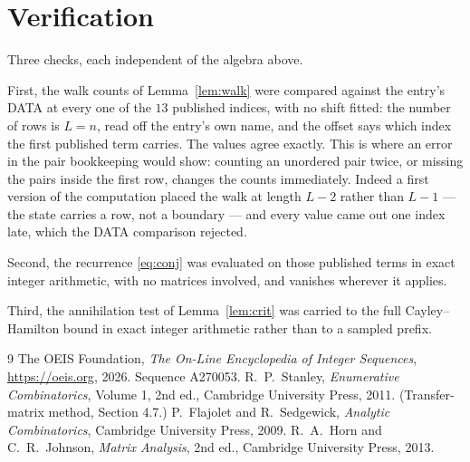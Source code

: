 \documentclass[11pt,a4paper]{article}
\theoremstyle{plain}
\theoremstyle{definition}
\begin{document}
\section{Verification}

Three checks, each independent of the algebra above.

First, the walk counts of Lemma~\ref{lem:walk} were compared against the entry's DATA at
every one of the $13$ published indices, with no shift fitted: the number of rows is
$L=n$, read off the entry's own name, and the offset says which index the first
published term carries. The values agree exactly. This is where an error in the pair
bookkeeping would show: counting an unordered pair twice, or missing the pairs inside the
first row, changes the counts immediately. Indeed a first version of the computation
placed the walk at length $L-2$ rather than $L-1$ --- the state carries a row, not a
boundary --- and every value came out one index late, which the DATA comparison rejected.

Second, the recurrence \eqref{eq:conj} was evaluated on those published terms in exact
integer arithmetic, with no matrices involved, and vanishes wherever it applies.

Third, the annihilation test of Lemma~\ref{lem:crit} was carried to the full
Cayley--Hamilton bound in exact integer arithmetic rather than to a sampled prefix.

\begin{thebibliography}{9}
 The OEIS Foundation, \emph{The On-Line Encyclopedia of Integer
Sequences}, \url{https://oeis.org}, 2026. Sequence A270053.
 R.~P.~Stanley, \emph{Enumerative Combinatorics}, Volume 1, 2nd ed.,
Cambridge University Press, 2011. (Transfer-matrix method, Section 4.7.)
 P.~Flajolet and R.~Sedgewick, \emph{Analytic Combinatorics}, Cambridge
University Press, 2009.
 R.~A.~Horn and C.~R.~Johnson, \emph{Matrix Analysis}, 2nd ed., Cambridge
University Press, 2013.
\end{thebibliography}
\end{document}
